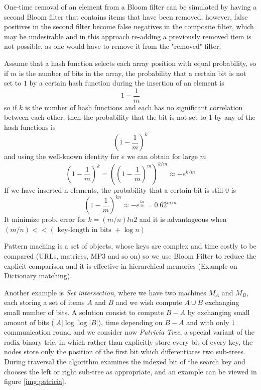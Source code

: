 One-time removal of an element from a Bloom filter can be simulated by having a second Bloom filter that contains items that have been removed, however, false positives
in the second filter become false negatives in the composite filter, which may be undesirable and in this approach re-adding a previously removed item is not possible,
as one would have to remove it from the "removed" filter.

Assume that a hash function selects each array position with equal probability, so if $m$ is the number of bits in the array, the probability that a certain bit
is not set to $1$ by a certain hash function during the insertion of an element is
\[ 1 - \frac{1}{m} \]
so if $k$ is the number of hash functions and each has no significant correlation between each other, then the probability that the bit is not set to 1 by any of the hash functions is
\[ (1 - \frac{1}{m})^k \]
and using the well-known identity for $e$ we can obtain for large $m$
\[ (1 - \frac{1}{m})^k = ((1 - \frac{1}{m})^m)^{k/m} \approx -e^{k/m} \]
If we have inserted n elements, the probability that a certain bit is still $0$ is 
\[ (1 - \frac{1}{m})^{kn} \approx -e^{\frac{kn}{m}} = 0.62^{m/n}\]
It minimize prob. error for $k = (m/n) ln 2$ and it is advantageous when $(m/n) << (\text{ key-length in bits } + \log n)$

Pattern maching is a set of objects, whose keys are complex and time costly to be compared (URLs, matrices, MP3 and so on) so we use Bloom Filter to
reduce the explicit comparison and it is effective in hierarchical memories (Example on Dictionary matching).

Another example is \emph{Set intersection}, where we have two machines $M_A$ and $M_B$, each storing a set of items $A$ and $B$ and we wish compute $A \cup B$
exchanging small number of bits.\newline
A solution consist to compute $B - A$ by exchanging small amount of bits ($|A| \log \log |B|$), time depending on $B - A$ and with only $1$ communication round and we consider now
\emph{Patricia Tree}, a special variant of the radix binary trie, in which rather than explicitly store every bit of every key, the nodes store only the position of the first bit
which differentiates two sub-trees.\newline
During traversal the algorithm examines the indexed bit of the search key and chooses the left or right sub-tree as appropriate, and an example can be viewed in figure \ref{img:patricia}.

